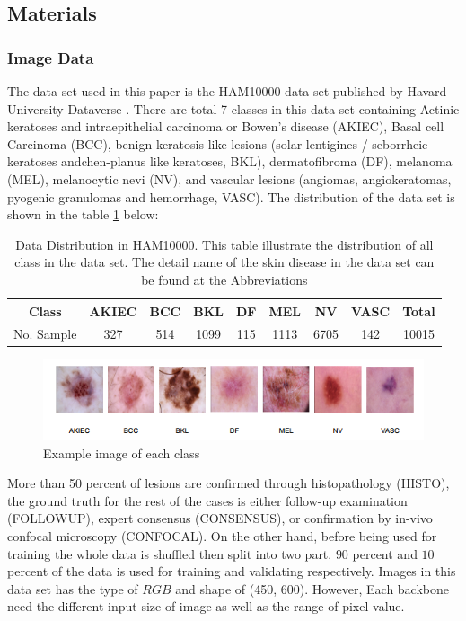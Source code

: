 \documentclass[sensors,article,submit,pdftex,moreauthors]{Definitions/mdpi}
\begin{document}
\subsection{Materials}
\subsubsection{Image Data}
The data set used in this paper is the HAM10000 data set published by Havard University Dataverse \cite{10417}. There are total 7 classes in this data set containing Actinic keratoses and intraepithelial carcinoma or Bowen's disease (AKIEC), Basal cell Carcinoma (BCC),  benign keratosis-like lesions (solar lentigines / seborrheic keratoses andchen-planus like keratoses, BKL), dermatofibroma (DF), melanoma (MEL), melanocytic nevi (NV), and vascular lesions (angiomas, angiokeratomas, pyogenic granulomas and hemorrhage, VASC). The distribution of the data set is shown in the table \ref{table:data-distribution} below:

\begin{table}[H]
	\centering
	\begin{tabular}{|c c c c c c c c c|} 
		\hline
		Class & AKIEC & BCC & BKL & DF & MEL & NV & VASC & Total \\ 
		\hline
		No. Sample & 327 & 514 & 1099 & 115 & 1113 & 6705 & 142 & 10015 \\
		\hline
	\end{tabular}
	\caption{Data Distribution in HAM10000. This table illustrate the distribution of all class in the data set. The detail name of the skin disease in the data set can be found at the Abbreviations}
	\label{table:data-distribution}
\end{table}

\begin{figure}[H]
	\centering
	\includegraphics[width=1\linewidth]{Definitions/DataDistribution}
	\caption{Example image of each class}
	\label{fig:data-sample}
\end{figure}

More than 50 percent of lesions are confirmed through histopathology (HISTO), the ground truth for the rest of the cases is either follow-up examination (FOLLOWUP), expert consensus (CONSENSUS), or confirmation by in-vivo confocal microscopy (CONFOCAL). On the other hand, before being used for training the whole data is shuffled then split into two part. $90$ percent and $10$ percent of the data is used for training and validating respectively. Images in this data set has the type of $RGB$ and shape of (450, 600). However, Each backbone need the different input size of image as well as the range of pixel value.
\end{document}
